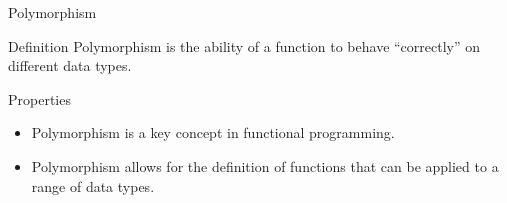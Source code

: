 \begin{frame}{Polymorphism}
    \begin{block}{Definition}
        Polymorphism is the ability of a function to behave ``correctly'' on different data types.
    \end{block}
    \begin{block}{Properties}
        \begin{itemize}
            \item Polymorphism is a key concept in functional programming.
            \item Polymorphism allows for the definition of functions that can be applied to a range of data types.
        \end{itemize}
    \end{block}
\end{frame}